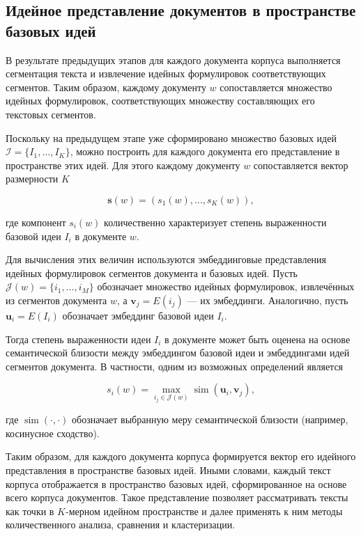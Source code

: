 \documentclass[review,3p,times]{elsarticle}
\begin{document}
\subsection{Идейное представление документов в пространстве базовых идей}

В результате предыдущих этапов для каждого документа корпуса выполняется сегментация текста и извлечение идейных формулировок соответствующих сегментов. Таким образом, каждому документу $w$ сопоставляется множество идейных формулировок, соответствующих множеству составляющих его текстовых сегментов.

Поскольку на предыдущем этапе уже сформировано множество базовых идей
$\mathcal{I}=\{I_1,\dots,I_K\}$, можно построить для каждого документа его представление в пространстве этих идей. Для этого каждому документу $w$ сопоставляется вектор размерности $K$

\[
\mathbf{s}(w)=(s_1(w),\dots,s_K(w)),
\]

где компонент $s_i(w)$ количественно характеризует степень выраженности базовой идеи $I_i$ в документе $w$.

Для вычисления этих величин используются эмбеддинговые представления идейных формулировок сегментов документа и базовых идей. Пусть $\mathcal{J}(w)=\{i_1,\dots,i_M\}$ обозначает множество идейных формулировок, извлечённых из сегментов документа $w$, а $\mathbf{v}_j = E(i_j)$ — их эмбеддинги. Аналогично, пусть $\mathbf{u}_i = E(I_i)$ обозначает эмбеддинг базовой идеи $I_i$.

Тогда степень выраженности идеи $I_i$ в документе может быть оценена на основе семантической близости между эмбеддингом базовой идеи и эмбеддингами идей сегментов документа. В частности, одним из возможных определений является

\[
s_i(w)=\max_{i_j \in \mathcal{J}(w)} \operatorname{sim}(\mathbf{u}_i,\mathbf{v}_j),
\]

где $\operatorname{sim}(\cdot,\cdot)$ обозначает выбранную меру семантической близости (например, косинусное сходство).

Таким образом, для каждого документа корпуса формируется вектор его идейного представления в пространстве базовых идей. Иными словами, каждый текст корпуса отображается в пространство базовых идей, сформированное на основе всего корпуса документов. Такое представление позволяет рассматривать тексты как точки в $K$-мерном идейном пространстве и далее применять к ним методы количественного анализа, сравнения и кластеризации.
\end{document}
